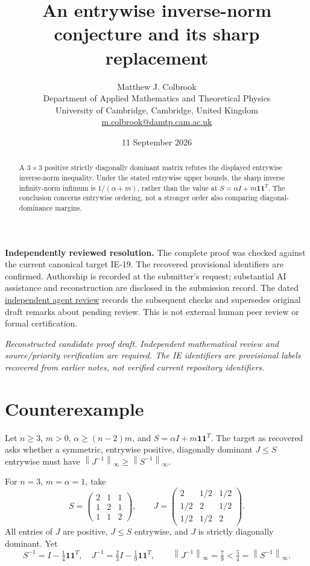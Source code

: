 \documentclass[11pt]{article}
\title{An entrywise inverse-norm conjecture and its sharp replacement}
\author{Matthew J. Colbrook\\\small Department of Applied Mathematics and Theoretical Physics\\\small University of Cambridge, Cambridge, United Kingdom\\\small\href{mailto:m.colbrook@damtp.cam.ac.uk}{m.colbrook@damtp.cam.ac.uk}}
\date{11 September 2026}
\newcommand{\norm}[1]{\left\lVert#1\right\rVert}
\newcommand{\one}{\boldsymbol 1}
\begin{document}
\maketitle

\noindent\textbf{Independently reviewed resolution.} The complete proof was checked against the current canonical target IE-19. The recovered provisional identifiers are confirmed. Authorship is recorded at the submitter's request; substantial AI assistance and reconstruction are disclosed in the submission record.
The dated \href{https://github.com/MColbrook/OpenProblemsInNLA/blob/codex/colbrook-recovered-submissions/references/colbrook-recovered-2026-09-11/verification/reviews/IE-19-review.md}{independent agent review} records the subsequent checks and supersedes original draft remarks about pending review. This is not external human peer review or formal certification.
\par\medskip

\noindent\textit{Reconstructed candidate proof draft. Independent mathematical review and source/priority verification are required. The IE identifiers are provisional labels recovered from earlier notes, not verified current repository identifiers.}


\begin{abstract}
A $3\times3$ positive strictly diagonally dominant matrix refutes the displayed entrywise inverse-norm inequality. Under the stated entrywise upper bounds, the sharp inverse infinity-norm infimum is $1/(\alpha+m)$, rather than the value at $S=\alpha I+m\one\one^T$. The conclusion concerns entrywise ordering, not a stronger order also comparing diagonal-dominance margins.
\end{abstract}
\section{Counterexample}
Let $n\ge3$, $m>0$, $\alpha\ge(n-2)m$, and $S=\alpha I+m\one\one^T$. The target as recovered asks whether a symmetric, entrywise positive, diagonally dominant $J\le S$ entrywise must have $\norm{J^{-1}}_\infty\ge\norm{S^{-1}}_\infty$.

For $n=3$, $m=\alpha=1$, take
\[
S=\begin{pmatrix}2&1&1\\1&2&1\\1&1&2\end{pmatrix},\qquad
J=\begin{pmatrix}2&1/2&1/2\\1/2&2&1/2\\1/2&1/2&2\end{pmatrix}.
\]
All entries of $J$ are positive, $J\le S$ entrywise, and $J$ is strictly diagonally dominant. Yet
\[
S^{-1}=I-\tfrac14\one\one^T,\quad J^{-1}=\tfrac23I-\tfrac19\one\one^T,
\qquad\boxed{\norm{J^{-1}}_\infty=\tfrac79<\tfrac54=\norm{S^{-1}}_\infty.}
\]
\end{document}
